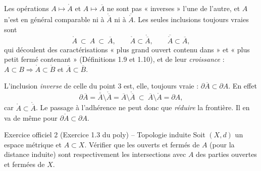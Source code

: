 \documentclass[11pt,a4paper]{article}
\newcommand{\interieur}[1]{\mathring{#1}}
\newcommand{\adh}[1]{\overline{#1}}
\theoremstyle{definition}
\begin{document}
\begin{pointcle}
Les opérations $A\mapsto\interieur{A}$ et $A\mapsto\adh{A}$ ne sont pas « inverses » l'une de l'autre, et $A$ n'est en général comparable ni à $\interieur{\adh{A}}$ ni à $\adh{\interieur{A}}$. Les seules inclusions toujours vraies sont
\[
\interieur{A}\ \subset\ A\ \subset\ \adh{A},\qquad
\interieur{A}\subset\interieur{\adh{A}},\qquad
\adh{\interieur{A}}\subset\adh{A},
\]
qui découlent des caractérisations « plus grand ouvert contenu dans » et « plus petit fermé contenant » (Définitions 1.9 et 1.10), et de leur \emph{croissance} : $A\subset B\Rightarrow \interieur{A}\subset\interieur{B}$ et $\adh{A}\subset\adh{B}$.
\end{pointcle}

\begin{commentaire}
L'inclusion \emph{inverse} de celle du point 3 est, elle, toujours vraie : $\partial\adh{A}\subset\partial A$. En effet
\[
\partial\adh{A} = \adh{\adh{A}}\setminus\interieur{\adh{A}} = \adh{A}\setminus\interieur{\adh{A}}
\ \subset\ \adh{A}\setminus\interieur{A} = \partial A,
\]
car $\interieur{A}\subset\interieur{\adh{A}}$. Le passage à l'adhérence ne peut donc que \emph{réduire} la frontière. Il en va de même pour $\partial\interieur{A}\subset\partial A$.
\end{commentaire}

\begin{exo}{Exercice officiel 2 (Exercice 1.3 du poly) -- Topologie induite}
Soit $(X,d)$ un espace métrique et $A\subset X$. Vérifier que les ouverts et fermés de $A$ (pour la distance induite) sont respectivement les intersections avec $A$ des parties ouvertes et fermées de $X$.
\end{exo}
\end{document}
